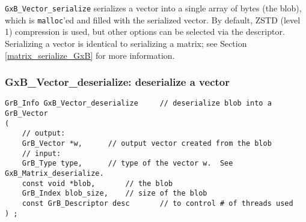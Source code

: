 \documentclass[12pt]{article}
\begin{document}
\verb'GxB_Vector_serialize' serializes a vector into a single array of bytes
(the blob), which is \verb'malloc''ed and filled with the serialized vector.
By default, ZSTD (level 1) compression is used, but other options can be
selected via the descriptor.  Serializing a vector is identical to serializing
a matrix; see Section \ref{matrix_serialize_GxB} for more information.

\newpage

% 

\subsubsection{{\sf GxB\_Vector\_deserialize:}    deserialize a vector}
\label{vector_deserialize_GxB}

\begin{mdframed}[userdefinedwidth=6in]
{\footnotesize
\begin{verbatim}
GrB_Info GxB_Vector_deserialize     // deserialize blob into a GrB_Vector
(
    // output:
    GrB_Vector *w,      // output vector created from the blob
    // input:
    GrB_Type type,      // type of the vector w.  See GxB_Matrix_deserialize.
    const void *blob,       // the blob
    GrB_Index blob_size,    // size of the blob
    const GrB_Descriptor desc       // to control # of threads used
) ;
\end{verbatim}
} \end{mdframed}
\end{document}
